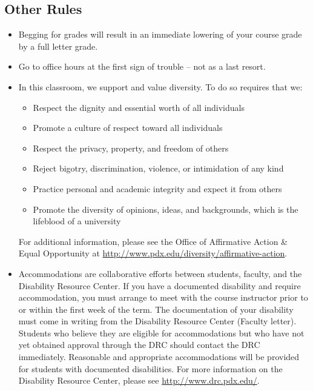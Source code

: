 \documentclass[letterpaper,10pt]{article}
\begin{document}
\subsection{Other Rules}
\begin{itemize}


\item Begging for grades will result in an immediate lowering of your
  course grade by a full letter grade.

\item Go to office hours at the first sign of trouble -- not as a last
  resort.

\item In this classroom, we support and value diversity.  To do so requires that we:
\begin{itemize}
   \item Respect the dignity and essential worth of all individuals
   \item Promote a culture of respect toward all individuals
    \item Respect the privacy, property, and freedom of others
    \item Reject bigotry, discrimination, violence, or intimidation of any kind
    \item Practice personal and academic integrity and expect it from others
   \item Promote the diversity of opinions, ideas, and backgrounds, which is
    the lifeblood of a university
\end{itemize}

 For additional information, please see the Office of Affirmative Action \& Equal Opportunity at \url{http://www.pdx.edu/diversity/affirmative-action}.


\item Accommodations are collaborative efforts between students, faculty, and the Disability Resource Center.  If you have a documented disability and require accommodation, you must arrange to meet with the course instructor prior to or within the first week of the term.  The documentation of your disability must come in writing from the Disability Resource Center (Faculty letter).  Students who believe they are eligible for accommodations but who have not yet obtained approval through the DRC should contact the DRC immediately.  Reasonable and appropriate accommodations will be provided for students with documented disabilities.  For more information on the Disability Resource Center, please see \url{http://www.drc.pdx.edu/}. 


\end{itemize}
\end{document}
